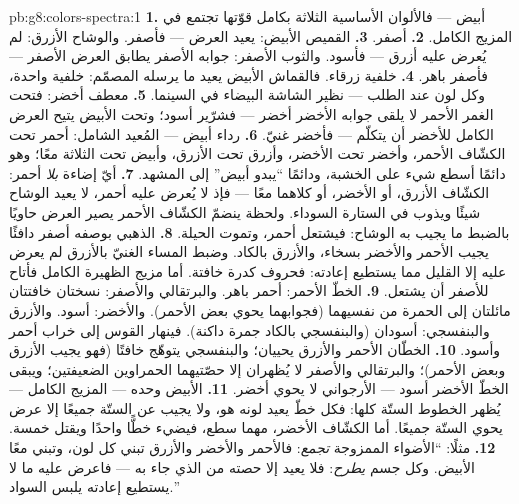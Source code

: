 \begin{solution}{pb:g8:colors-spectra:1}
\textbf{1.} أبيض --- فالألوان الأساسية الثلاثة بكامل قوّتها
تجتمع في المزيج الكامل.
\textbf{2.} أصفر.
\textbf{3.} القميص الأبيض: يعيد العرض --- فأصفر. والوشاح
الأزرق: لم يُعرض عليه أزرق --- فأسود. والثوب الأصفر: جوابه
الأصفر يطابق العرض الأصفر --- فأصفر باهر.
\textbf{4.} خلفية زرقاء. فالقماش الأبيض يعيد ما يرسله
المصمّم: خلفية واحدة، وكل لون عند الطلب --- نظير الشاشة
البيضاء في السينما.
\textbf{5.} معطف أخضر: فتحت الغمر الأحمر لا يلقى جوابه الأخضر
أخضر --- فشرّير أسود؛ وتحت  الأبيض يتيح العرض الكامل
للأخضر أن يتكلّم --- فأخضر غنيّ.
\textbf{6.} رداء أبيض --- المُعيد الشامل: أحمر تحت الكشّاف
الأحمر، وأخضر تحت الأخضر، وأزرق تحت الأزرق، وأبيض تحت الثلاثة
معًا؛ وهو دائمًا أسطع شيء على الخشبة، ودائمًا ``يبدو أبيض''
 إلى المشهد.
\textbf{7.} أيّ إضاءة \emph{بلا} أحمر: الكشّاف الأزرق، أو
الأخضر، أو كلاهما معًا --- فإذ لا يُعرض عليه أحمر، لا يعيد
الوشاح شيئًا ويذوب في الستارة السوداء. ولحظة ينضمّ الكشّاف
الأحمر يصير العرض حاويًا بالضبط ما يجيب به الوشاح: فيشتعل
أحمر، وتموت الحيلة.
\textbf{8.} الذهبي بوصفه أصفر دافئًا يجيب الأحمر والأخضر
بسخاء، والأزرق بالكاد. وضبط المساء الغنيّ بالأزرق لم يعرض
عليه إلا القليل مما يستطيع إعادته: فحروف كدرة خافتة. أما مزيج
الظهيرة الكامل فأتاح للأصفر أن يشتعل.
\textbf{9.} الخطّ الأحمر: أحمر باهر. والبرتقالي والأصفر:
نسختان خافتتان مائلتان إلى الحمرة من نفسيهما (فجوابهما يحوي
بعض الأحمر). والأخضر: أسود. والأزرق والبنفسجي: أسودان
(والبنفسجي بالكاد جمرة داكنة). فينهار القوس إلى خراب أحمر
وأسود.
\textbf{10.} الخطّان الأحمر والأزرق يحييان؛ والبنفسجي يتوهّج
خافتًا (فهو يجيب الأزرق وبعض الأحمر)؛ والبرتقالي والأصفر لا
يُظهران إلا حصّتيهما الحمراوين الضعيفتين؛ ويبقى الخطّ الأخضر
أسود ---  الأرجواني لا يحوي أخضر.
\textbf{11.}  الأبيض وحده --- المزيج الكامل --- يُظهر
الخطوط الستّة كلها: فكل خطّ يعيد لونه هو، ولا يجيب عن الستّة
جميعًا إلا عرض يحوي الستّة جميعًا. أما الكشّاف الأخضر، مهما
سطع، فيضيء خطًّا واحدًا ويقتل خمسة.
\textbf{12.} مثلًا: ``الأضواء الممزوجة \emph{تجمع}: فالأحمر
والأخضر والأزرق تبني كل لون، وتبني معًا الأبيض. وكل جسم
\emph{يطرح}: فلا يعيد إلا حصته من الذي جاء به  --- فاعرض
عليه ما لا يستطيع إعادته يلبس السواد.''
\end{solution}
